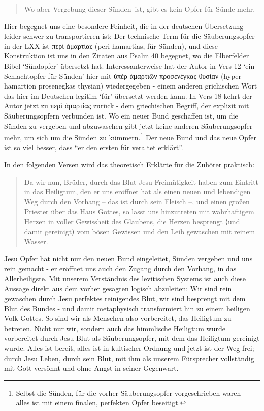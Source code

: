 \begin{quote}
Wo aber Vergebung dieser \textlangle Sünden\textrangle\ ist, gibt es kein Opfer für Sünde mehr.
\end{quote}
Hier begegnet uns eine besondere Feinheit, die in der deutschen Übersetzung leider schwer zu transportieren ist:
Der technische Term für die Säuberungsopfer in der LXX ist περὶ ἁμαρτίας (peri hamartias, für Sünden), und diese Konstruktion ist uns in den Zitaten aus Psalm 40 begegnet, wo die Elberfelder Bibel `Sündopfer' übersetzt hat.
Interessanterweise hat der Autor in Vers 12 `ein Schlachtopfer für Sünden' hier mit ὑπὲρ ἁμαρτιῶν προσενέγκας θυσίαν (hyper hamartion prosenegkas thysian) wiedergegeben - einem anderen grichischen Wort das hier im Deutschen legitim `für' übersetzt werden kann.
In Vers 18 kehrt der Autor jetzt zu περὶ ἁμαρτίας zurück - dem griechischen Begriff, der explizit mit Säuberungsopfern verbunden ist.
Wo ein neuer Bund geschaffen ist, um die Sünden zu vergeben und abzuwaschen gibt jetzt keine anderen Säuberungsopfer mehr, um sich um die Sünden zu kümmern.\footnote{
Selbst die Sünden, für die vorher Säuberungsopfer vorgeschrieben waren - alles ist mit einem finalen, perfekten Opfer beseitigt.}
Der neue Bund und das neue Opfer ist so viel besser, dass ``er den ersten für veraltet erklärt''.

In den folgenden Versen wird das theoretisch Erklärte für die Zuhörer praktisch:
\begin{quote}
Da wir nun, Brüder, durch das Blut Jesu Freimütigkeit haben zum Eintritt in das Heiligtum,
den er uns eröffnet hat als einen neuen und lebendigen Weg durch den Vorhang – das ist durch sein Fleisch –,
und einen großen Priester über das Haus Gottes,
so lasst uns hinzutreten mit wahrhaftigem Herzen in voller Gewissheit des Glaubens,
die Herzen besprengt ⟨und damit gereinigt⟩ vom bösen Gewissen und den Leib gewaschen mit reinem Wasser.
\end{quote}
Jesu Opfer hat nicht nur den neuen Bund eingeleitet, Sünden vergeben und uns rein gemacht - er eröffnet uns auch den Zugang durch den Vorhang, in das Allerheiligste.
Mit unserem Verständnis des levitischen Systems ist auch diese Aussage direkt aus dem vorher gesagten logisch abzuleiten:
Wir sind rein gewaschen durch Jesu perfektes reinigendes Blut,
wir sind besprengt mit dem Blut des Bundes - und damit metaphysisch transformiert hin zu einem heiligen Volk Gottes.
So sind wir als Menschen also vorbereitet, das Heiligtum zu betreten.
Nicht nur wir, sondern auch das himmlische Heiligtum wurde vorbereitet durch Jesu Blut als Säuberungsopfer, mit dem das Heiligtum gereinigt wurde.
Alles ist bereit, alles ist in kultischer Ordnung und jetzt ist der Weg frei;
durch Jesu Leben, durch sein Blut, mit ihm als unserem Fürsprecher vollständig mit Gott versöhnt und ohne Angst in seiner Gegenwart.

